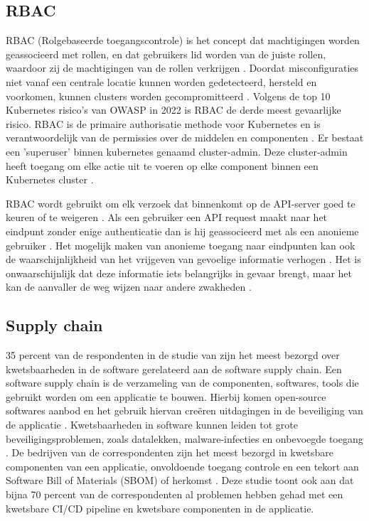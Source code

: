 \subsection{RBAC}
RBAC (Rolgebaseerde toegangscontrole) is het concept dat machtigingen worden geassocieerd met rollen, en dat gebruikers lid worden van de juiste rollen, waardoor zij de machtigingen van de rollen verkrijgen \autocite{Sandhu1998}. Doordat misconfiguraties niet vanaf een centrale locatie kunnen worden gedetecteerd, hersteld en voorkomen, kunnen clusters worden gecompromitteerd \autocite{OWASP-2023}. Volgens de top 10 Kubernetes risico's van OWASP in 2022 is RBAC de derde meest gevaarlijke risico. RBAC is de primaire authorisatie methode voor Kubernetes en is verantwoordelijk van de permissies over de middelen en componenten \autocite{OWASP-2023}. Er bestaat een 'superuser' binnen kubernetes genaamd cluster-admin. Deze cluster-admin heeft toegang om elke actie uit te voeren op elke component binnen een Kubernetes cluster \autocite{OWASP-2023}. 

RBAC wordt gebruikt om elk verzoek dat binnenkomt op de API-server goed te keuren of te weigeren \autocite{mytilinakis2020attack}. Als een gebruiker een API request maakt naar het eindpunt zonder enige authenticatie dan is hij geassocieerd met als een anonieme gebruiker \autocite{mytilinakis2020attack}. Het mogelijk maken van anonieme toegang naar eindpunten kan ook de waarschijnlijkheid van het vrijgeven van gevoelige informatie verhogen \autocite{Rice2018}. Het is onwaarschijnlijk dat deze informatie iets belangrijks in gevaar brengt, maar het kan de aanvaller de weg wijzen naar andere zwakheden \autocite{Rice2018}.

\subsection{Supply chain}
35 percent van de respondenten in de studie van \textcite{red-hat-2023} zijn het meest bezorgd over kwetsbaarheden in de software gerelateerd aan de software supply chain. Een software supply chain is de verzameling van de componenten, softwares, tools die gebruikt worden om een applicatie te bouwen. Hierbij komen open-source softwares aanbod en het gebruik hiervan creëren uitdagingen in de beveiliging van de applicatie \autocite{red-hat-2023}. Kwetsbaarheden in software kunnen leiden tot grote beveiligingsproblemen, zoals datalekken, malware-infecties en onbevoegde toegang \autocite{shamim2020xi}. De bedrijven van de correspondenten zijn het meest bezorgd in kwetsbare componenten van een applicatie, onvoldoende toegang controle en een tekort aan Software Bill of Materials (SBOM) of herkomst \autocite{red-hat-2023}. Deze studie toont ook aan dat bijna 70 percent van de correspondenten al problemen hebben gehad met een kwetsbare CI/CD pipeline en kwetsbare componenten in de applicatie. \newline

